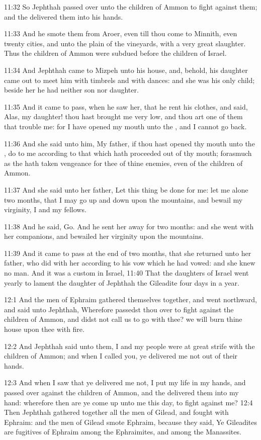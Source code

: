 11:32 So Jephthah passed over unto the children of Ammon to fight
against them; and the \LORD delivered them into his hands.

11:33 And he smote them from Aroer, even till thou come to Minnith,
even twenty cities, and unto the plain of the vineyards, with a very
great slaughter. Thus the children of Ammon were subdued before the
children of Israel.

11:34 And Jephthah came to Mizpeh unto his house, and, behold, his
daughter came out to meet him with timbrels and with dances: and she
was his only child; beside her he had neither son nor daughter.

11:35 And it came to pass, when he saw her, that he rent his clothes,
and said, Alas, my daughter! thou hast brought me very low, and thou
art one of them that trouble me: for I have opened my mouth unto the
\LORD, and I cannot go back.

11:36 And she said unto him, My father, if thou hast opened thy mouth
unto the \LORD, do to me according to that which hath proceeded out of
thy mouth; forasmuch as the \LORD hath taken vengeance for thee of
thine enemies, even of the children of Ammon.

11:37 And she said unto her father, Let this thing be done for me: let
me alone two months, that I may go up and down upon the mountains, and
bewail my virginity, I and my fellows.

11:38 And he said, Go. And he sent her away for two months: and she
went with her companions, and bewailed her virginity upon the
mountains.

11:39 And it came to pass at the end of two months, that she returned
unto her father, who did with her according to his vow which he had
vowed: and she knew no man. And it was a custom in Israel, 11:40 That
the daughters of Israel went yearly to lament the daughter of Jephthah
the Gileadite four days in a year.

12:1 And the men of Ephraim gathered themselves together, and went
northward, and said unto Jephthah, Wherefore passedst thou over to
fight against the children of Ammon, and didst not call us to go with
thee? we will burn thine house upon thee with fire.

12:2 And Jephthah said unto them, I and my people were at great strife
with the children of Ammon; and when I called you, ye delivered me not
out of their hands.

12:3 And when I saw that ye delivered me not, I put my life in my
hands, and passed over against the children of Ammon, and the \LORD
delivered them into my hand: wherefore then are ye come up unto me
this day, to fight against me?  12:4 Then Jephthah gathered together
all the men of Gilead, and fought with Ephraim: and the men of Gilead
smote Ephraim, because they said, Ye Gileadites are fugitives of
Ephraim among the Ephraimites, and among the Manassites.

